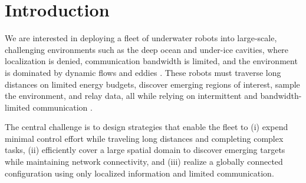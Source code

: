 \documentclass[conference]{IEEEconf}
\theoremstyle{plain}
\begin{document}

\section{Introduction}

We are interested in deploying a fleet of underwater robots into large-scale, challenging environments such as the deep ocean and under-ice cavities, where localization is denied, communication bandwidth is limited, and the environment is dominated by dynamic flows and eddies \cite{muto2024}. 
These robots must traverse long distances on limited energy budgets, discover emerging regions of interest, sample the environment, and relay data, all while relying on intermittent and bandwidth-limited communication \cite{schiel2024chirps, schiel2024role}.

The central challenge is to design strategies that enable the fleet to (i) expend minimal control effort while traveling long distances and completing complex tasks, (ii) efficiently cover a large spatial domain to discover emerging targets while maintaining network connectivity, and (iii) realize a globally connected configuration using only localized information and limited communication.


\end{document}
